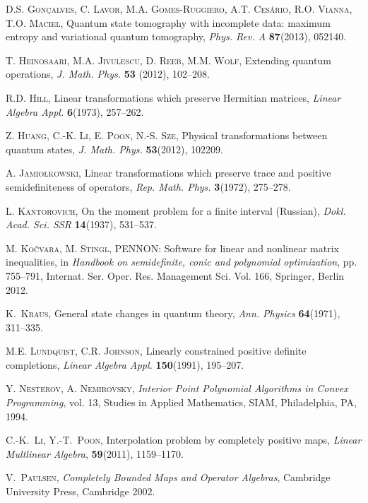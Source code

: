 \documentclass[12pt]{amsart}
\theoremstyle{definition}
\begin{document}
\begin{thebibliography}{99}
 \textsc{D.S. Gon\c calves, C. Lavor, M.A. Gomes-Ruggiero, 
A.T. Ces\'ario, R.O. Vianna, T.O. Maciel}, Quantum state tomography with 
incomplete data: maximum entropy and variational quantum tomography, 
\textit{Phys. Rev. A} \textbf{87}(2013), 052140.

 \textsc{T. Heinosaari, M.A. Jivulescu, D. Reeb, M.M. Wolf}, Extending 
quantum operations, {\it J. Math. Phys.} {\bf 53} (2012), 102--208.

 \textsc{R.D. Hill}, Linear transformations which preserve Hermitian 
matrices, \textit{Linear Algebra Appl.} \textbf{6}(1973), 257--262.

 \textsc{Z. Huang, C.-K. Li, E. Poon, N.-S. Sze}, 
Physical transformations between quantum states,
\textit{J. Math. Phys.} \textbf{53}(2012), 102209.

 \textsc{A. Jamio\l kowski}, Linear transformations which 
preserve trace and positive semidefiniteness of operators, \textit{Rep. Math.
Phys.} \textbf{3}(1972), 275--278.

 \textsc{L. Kantorovich},
On the moment problem for a finite interval (Russian),
\textit{Dokl. Acad. Sci. SSR} \textbf{14}(1937), 531--537.

 \textsc{M. Ko\v{c}vara,  M. Stingl},  PENNON: Software for 
linear and nonlinear matrix inequalities, in \textit{Handbook on semidefinite, conic 
and polynomial optimization}, pp. 755--791, Internat. Ser. Oper. Res. Management 
Sci. Vol. 166, Springer, Berlin 2012.

 \textsc{K.~Kraus},
General state changes in quantum theory,
\textit{Ann. Physics} \textbf{64}(1971), 311--335. 

 \textsc{M.E. Lundquist, C.R. Johnson}, 
Linearly constrained positive definite completions, {\it Linear Algebra Appl.} 
{\bf 150}(1991), 195--207.

 \textsc{Y. Nesterov, A. Nemirovsky}, \textit{Interior 
Point Polynomial Algorithms in Convex Programming}, vol. 13, Studies in Applied 
Mathematics, SIAM, Philadelphia, PA, 1994.

 \textsc{C.-K.~Li, Y.-T.~Poon}, Interpolation problem by completely 
positive maps, \textit{Linear Multlinear Algebra}, \textbf{59}(2011), 1159--1170.

 \textsc{V.~Paulsen}, 
\textit{Completely Bounded Maps and Operator Algebras}, 
Cambridge University Press, Cambridge 2002.


\end{thebibliography}
\end{document}
